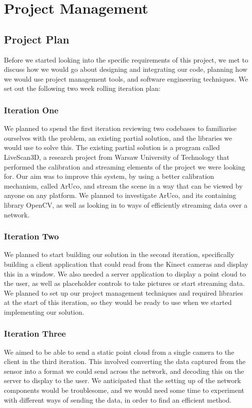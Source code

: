 \documentclass{article}
\begin{document}
\newpage
\section{Project Management}
\subsection{Project Plan}
Before we started looking into the specific requirements of this project, we met to discuss how we would go about designing and integrating our code, planning how we would use project management tools, and software engineering techniques. We set out the following two week rolling iteration plan:

\subsubsection{Iteration One}
We planned to spend the first iteration reviewing two codebases to familiarise ourselves with the problem, an existing partial solution, and the libraries we would use to solve this. The existing partial solution is a program called LiveScan3D, a research project from Warsaw University of Technology that performed the calibration and streaming elements of the project we were looking for. Our aim was to improve this system, by using a better calibration mechanism, called ArUco, and stream the scene in a way that can be viewed by anyone on any platform. We planned to investigate ArUco, and its containing library OpenCV, as well as looking in to ways of efficiently streaming data over a network.
\subsubsection{Iteration Two}
We planned to start building our solution in the second iteration, specifically building a client application that could read from the Kinect cameras and display this in a window. We also needed a server application to display a point cloud to the user, as well as placeholder controls to take pictures or start streaming data. We planned to set up our project management techniques and required libraries at the start of this iteration, so they would be ready to use when we started implementing our solution.
\subsubsection{Iteration Three}
We aimed to be able to send a static point cloud from a single camera to the client in the third iteration. This involved converting the data captured from the sensor into a format we could send across the network, and decoding this on the server to display to the user. We anticipated that the setting up of the network components would be troublesome, and we would need some time to experiment with different ways of sending the data, in order to find an efficient method.
\end{document}
